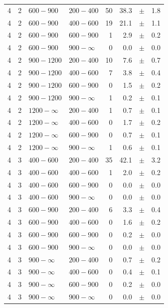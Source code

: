 \begin{table}[!t]
\begin{tabular}{rrllrrcl}
4 & 2 & $ 600- 900$ & $200-400$ &     50 &     38.3 &$\pm$&    1.8 \\
4 & 2 & $ 600- 900$ & $400-600$ &     19 &     21.1 &$\pm$&    1.1 \\
4 & 2 & $ 600- 900$ & $600-900$ &      1 &      2.9 &$\pm$&    0.2 \\
4 & 2 & $ 600- 900$ & $900-\infty$ &      0 &      0.0 &$\pm$&    0.0 \\
4 & 2 & $ 900-1200$ & $200-400$ &     10 &      7.6 &$\pm$&    0.7 \\
4 & 2 & $ 900-1200$ & $400-600$ &      7 &      3.8 &$\pm$&    0.4 \\
4 & 2 & $ 900-1200$ & $600-900$ &      0 &      1.5 &$\pm$&    0.2 \\
4 & 2 & $ 900-1200$ & $900-\infty$ &      1 &      0.2 &$\pm$&    0.1 \\
4 & 2 & $1200- \infty$ & $200-400$ &      1 &      0.7 &$\pm$&    0.1 \\
4 & 2 & $1200- \infty$ & $400-600$ &      0 &      1.7 &$\pm$&    0.2 \\
4 & 2 & $1200- \infty$ & $600-900$ &      0 &      0.7 &$\pm$&    0.1 \\
4 & 2 & $1200- \infty$ & $900-\infty$ &      1 &      0.6 &$\pm$&    0.1 \\
4 & 3 & $ 400- 600$ & $200-400$ &     35 &     42.1 &$\pm$&    3.2 \\
4 & 3 & $ 400- 600$ & $400-600$ &      1 &      2.0 &$\pm$&    0.2 \\
4 & 3 & $ 400- 600$ & $600-900$ &      0 &      0.0 &$\pm$&    0.0 \\
4 & 3 & $ 400- 600$ & $900-\infty$ &      0 &      0.0 &$\pm$&    0.0 \\
4 & 3 & $ 600- 900$ & $200-400$ &      6 &      3.3 &$\pm$&    0.4 \\
4 & 3 & $ 600- 900$ & $400-600$ &      0 &      1.6 &$\pm$&    0.2 \\
4 & 3 & $ 600- 900$ & $600-900$ &      0 &      0.2 &$\pm$&    0.0 \\
4 & 3 & $ 600- 900$ & $900-\infty$ &      0 &      0.0 &$\pm$&    0.0 \\
4 & 3 & $ 900- \infty$ & $200-400$ &      0 &      0.7 &$\pm$&    0.2 \\
4 & 3 & $ 900- \infty$ & $400-600$ &      0 &      0.4 &$\pm$&    0.1 \\
4 & 3 & $ 900- \infty$ & $600-900$ &      0 &      0.2 &$\pm$&    0.0 \\
4 & 3 & $ 900- \infty$ & $900-\infty$ &      0 &      0.0 &$\pm$&    0.0 \\
    \hline
  \end{tabular}
\end{table}

